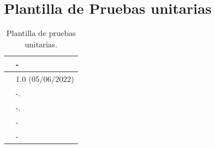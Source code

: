 \section{Plantilla de Pruebas unitarias}

\begin{table}[H]
\begin{center}
\begin{tabular}{|p{3cm}|p{10cm}|} \hline
\centering {\bf PU-XX} & -  \\ \hline\hline
\centering {\bf Versión} & 1.0 (05/06/2022) \\ \hline
\centering {\bf Dependencias} &  -. \\ \hline
\centering {\bf Descripción} &  -. \\ \hline
\centering {\bf Criterio de aceptación} & - \\ \hline
\centering {\bf Estado} & - \\ \hline
\end{tabular}
\caption{Plantilla de pruebas unitarias.}
\label{enlacePUX}
\end{center}
\end{table}